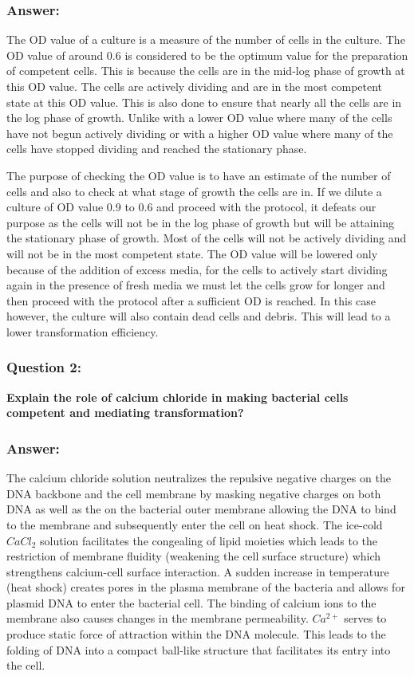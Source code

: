 \documentclass{report}
\begin{document}
\subsubsection*{Answer:}
The OD value of a culture is a measure of the number of cells in the culture.
The OD value of around 0.6 is considered to be the optimum value for the preparation of competent cells. This is because the cells are in the mid-log phase of growth at this OD value.
The cells are actively dividing and are in the most competent state at this OD value. This is also done to ensure that nearly all the cells are in the log phase of growth. 
Unlike with a lower OD value where many of the cells have not begun actively dividing or with a higher OD value where many of the cells have stopped dividing and reached the stationary phase.

The purpose of checking the OD value is to have an estimate of the number of cells and also to check at what stage of growth the cells are in. 
If we dilute a culture of OD value 0.9 to 0.6 and proceed with the protocol, it defeats our purpose as the cells will not be in the log phase of growth but will be attaining the stationary phase of growth.
Most of the cells will not be actively dividing and will not be in the most competent state. The OD value will be lowered only because of the addition of excess media, for the cells to actively start dividing
again in the presence of fresh media we must let the cells grow for longer and then proceed with the protocol after a sufficient OD is reached. In this case
however, the culture will also contain dead cells and debris. This will lead to a lower transformation efficiency.

\subsubsection*{Question 2:}
\textbf{Explain the role of calcium chloride in making bacterial cells competent and mediating transformation?}

\subsubsection*{Answer:}
The calcium chloride solution neutralizes the repulsive negative charges on the DNA backbone and the cell membrane
by masking negative charges on both DNA as well as the on the bacterial outer membrane
allowing the DNA to bind to the membrane and subsequently enter the cell on heat shock.
The ice-cold $CaCl_2$ solution facilitates the congealing of lipid moieties which leads to the restriction of membrane 
fluidity (weakening the cell surface structure) which strengthens calcium-cell surface interaction. 
A sudden increase in temperature (heat shock) creates pores in the plasma membrane of the bacteria and allows for 
plasmid DNA to enter the bacterial cell.
The binding of calcium ions to the membrane also causes changes in the membrane permeability.
$Ca^{2+}$ serves to produce static force of attraction within the DNA molecule.
This leads to the folding of DNA into a compact ball-like structure that facilitates its entry into the cell.
\end{document}
